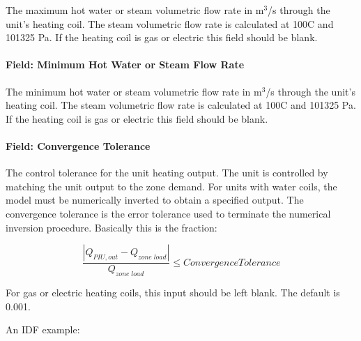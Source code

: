 The maximum hot water or steam volumetric flow rate in m\(^{3}\)/s through the unit's heating coil. The steam volumetric flow rate is calculated at 100C and 101325 Pa. If the heating coil is gas or electric this field should be blank.

\paragraph{Field: Minimum Hot Water or Steam Flow Rate}\label{field-minimum-hot-water-or-steam-flow-rate-5}

The minimum hot water or steam volumetric flow rate in m\(^{3}\)/s through the unit's heating coil. The steam volumetric flow rate is calculated at 100C and 101325 Pa. If the heating coil is gas or electric this field should be blank.

\paragraph{Field: Convergence Tolerance}\label{field-convergence-tolerance-4}

The control tolerance for the unit heating output. The unit is controlled by matching the unit output to the zone demand. For units with water coils, the model must be numerically inverted to obtain a specified output. The convergence tolerance is the error tolerance used to terminate the numerical inversion procedure. Basically this is the fraction:

\begin{equation}
\frac{{\left| {{Q_{PIU,out}} - {Q_{zone\;load}}} \right|}}{{{Q_{zone\;load}}}} \le ConvergenceTolerance
\end{equation}

For gas or electric heating coils, this input should be left blank. The default is 0.001.

An IDF example:

